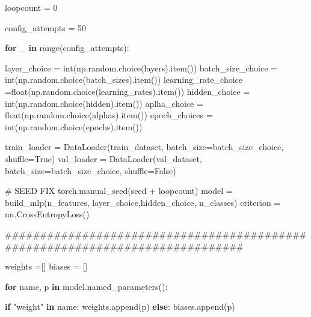 \documentclass[
  letterpaper,
  DIV=11,
  numbers=noendperiod]{scrartcl}
\newenvironment{Shaded}{\begin{snugshade}}{\end{snugshade}}
\newcommand{\BuiltInTok}[1]{\textcolor[rgb]{0.00,0.23,0.31}{#1}}
\newcommand{\CommentTok}[1]{\textcolor[rgb]{0.37,0.37,0.37}{#1}}
\newcommand{\ControlFlowTok}[1]{\textcolor[rgb]{0.00,0.23,0.31}{\textbf{#1}}}
\newcommand{\DecValTok}[1]{\textcolor[rgb]{0.68,0.00,0.00}{#1}}
\newcommand{\KeywordTok}[1]{\textcolor[rgb]{0.00,0.23,0.31}{\textbf{#1}}}
\newcommand{\NormalTok}[1]{\textcolor[rgb]{0.00,0.23,0.31}{#1}}
\newcommand{\OperatorTok}[1]{\textcolor[rgb]{0.37,0.37,0.37}{#1}}
\newcommand{\StringTok}[1]{\textcolor[rgb]{0.13,0.47,0.30}{#1}}
\newcommand{\VariableTok}[1]{\textcolor[rgb]{0.07,0.07,0.07}{#1}}
\begin{document}
\begin{Shaded}
\begin{Highlighting}[]
\NormalTok{    loopcount }\OperatorTok{=} \DecValTok{0}

\NormalTok{    config\_attempts }\OperatorTok{=} \DecValTok{50}



    \ControlFlowTok{for}\NormalTok{ \_ }\KeywordTok{in} \BuiltInTok{range}\NormalTok{(config\_attempts):}


\NormalTok{        layer\_choice }\OperatorTok{=}  \BuiltInTok{int}\NormalTok{(np.random.choice(layers).item())}
\NormalTok{        batch\_size\_choice }\OperatorTok{=} \BuiltInTok{int}\NormalTok{(np.random.choice(batch\_sizes).item())}
\NormalTok{        learning\_rate\_choice }\OperatorTok{=}\BuiltInTok{float}\NormalTok{(np.random.choice(learning\_rates).item())}
\NormalTok{        hidden\_choice }\OperatorTok{=} \BuiltInTok{int}\NormalTok{(np.random.choice(hidden).item())}
\NormalTok{        aplha\_choice }\OperatorTok{=} \BuiltInTok{float}\NormalTok{(np.random.choice(alphas).item())}
\NormalTok{        epoch\_choices }\OperatorTok{=} \BuiltInTok{int}\NormalTok{(np.random.choice(epochs).item())}

\NormalTok{        train\_loader }\OperatorTok{=}\NormalTok{ DataLoader(train\_dataset, batch\_size}\OperatorTok{=}\NormalTok{batch\_size\_choice, shuffle}\OperatorTok{=}\VariableTok{True}\NormalTok{)}
\NormalTok{        val\_loader   }\OperatorTok{=}\NormalTok{ DataLoader(val\_dataset,   batch\_size}\OperatorTok{=}\NormalTok{batch\_size\_choice, shuffle}\OperatorTok{=}\VariableTok{False}\NormalTok{)}

        \CommentTok{\# SEED FIX}
\NormalTok{        torch.manual\_seed(seed }\OperatorTok{+}\NormalTok{ loopcount)}
\NormalTok{        model }\OperatorTok{=}\NormalTok{ build\_mlp(n\_features, layer\_choice,hidden\_choice, n\_classes)}
\NormalTok{        criterion }\OperatorTok{=}\NormalTok{ nn.CrossEntropyLoss()}

        \CommentTok{\#\#\#\#\#\#\#\#\#\#\#\#\#\#\#\#\#\#\#\#\#\#\#\#\#\#\#\#\#\#\#\#\#\#\#\#\#\#\#\#\#\#\#\#\#\#\#\#\#\#\#\#\#\#\#\#\#\#\#\#\#\#\#\#\#\#\#\#\#\#\#\#\#\#\#\#\# }


\NormalTok{        weights }\OperatorTok{=}\NormalTok{[]}
\NormalTok{        biases }\OperatorTok{=}\NormalTok{ []}
        
        \ControlFlowTok{for}\NormalTok{ name, p }\KeywordTok{in}\NormalTok{ model.named\_parameters():}
            
            \ControlFlowTok{if} \StringTok{"weight"} \KeywordTok{in}\NormalTok{ name:}
\NormalTok{                weights.append(p)}
            \ControlFlowTok{else}\NormalTok{:}
\NormalTok{                biases.append(p) }
            

\end{Highlighting}
\end{Shaded}
\end{document}
